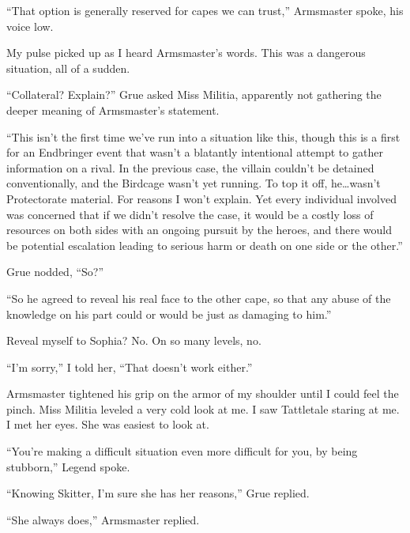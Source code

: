 ``That option is generally reserved for capes we can trust,'' Armsmaster spoke, his voice low.



My pulse picked up as I heard Armsmaster's words.  This was a dangerous situation, all of a sudden.



``Collateral?  Explain?'' Grue asked Miss Militia, apparently not gathering the deeper meaning of Armsmaster's statement.



``This isn't the first time we've run into a situation like this, though this is a first for an Endbringer event that wasn't a blatantly intentional attempt to gather information on a rival.  In the previous case, the villain couldn't be detained conventionally, and the Birdcage wasn't yet running.  To top it off, he\ldots wasn't Protectorate material.  For reasons I won't explain.  Yet every individual involved was concerned that if we didn't resolve the case, it would be a costly loss of resources on both sides with an ongoing pursuit by the heroes, and there would be potential escalation leading to serious harm or death on one side or the other.''



Grue nodded, ``So?''



``So he agreed to reveal his real face to the other cape, so that any abuse of the knowledge on his part could or would be just as damaging to him.''



Reveal myself to Sophia?  No.  On so many levels, no.



``I'm sorry,'' I told her, ``That doesn't work either.''



Armsmaster tightened his grip on the armor of my shoulder until I could feel the pinch.  Miss Militia leveled a very cold look at me.  I saw Tattletale staring at me.  I met her eyes.  She was easiest to look at.



``You're making a difficult situation even more difficult for you, by being stubborn,'' Legend spoke.



``Knowing Skitter, I'm sure she has her reasons,'' Grue replied.



``She always does,'' Armsmaster replied.



